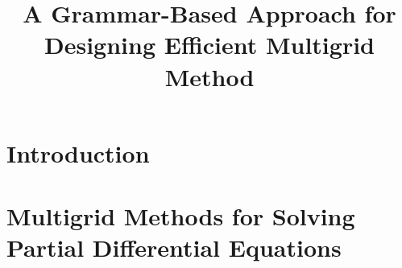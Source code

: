 \documentclass[
  paper = 17x24,
  language = english,
  acronym = split,
  acronymline = novertical,
  bibliography = combined,
  bibliographypart = all,
  titlesize = Huge,
  par = halfskip,
]{faupress}
\title{A Grammar-Based Approach for Designing Efficient Multigrid Method}
\institute{Lehrstuhl für Informatik 10}
\theoremstyle{definition}
\begin{document}
\maketitle

\frontmatter
  
  \makefacultytitle

  \begin{preface}
   
    
  \end{preface}

  \tableofcontents

  \faupressprintacronyms
  
  \listoffigures
  
  \listoftables

\mainmatter

\chapter{Introduction}
  

\chapter{Multigrid Methods for Solving Partial Differential Equations}
  
  
  
\end{document}
